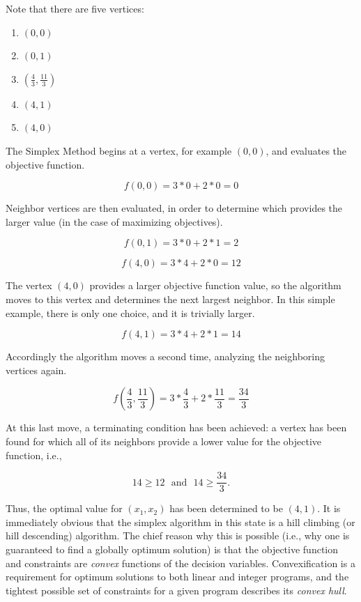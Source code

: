Note that there are five vertices:

\begin{enumerate}
  \item $(0, 0)$
  \item $(0, 1)$
  \item $(\frac{4}{3}, \frac{11}{3})$
  \item $(4, 1)$
  \item $(4, 0)$
\end{enumerate}

The Simplex Method begins at a vertex, for example $(0, 0)$, and evaluates the
objective function.

\begin{equation}
    f(0, 0) = 3 * 0 + 2 * 0 = 0 
\end{equation}

Neighbor vertices are then evaluated, in order to determine which provides the
larger value (in the case of maximizing objectives).

\begin{equation}
    f(0, 1) = 3 * 0 + 2 * 1 = 2 
\end{equation}

\begin{equation}
    f(4, 0) = 3 * 4 + 2 * 0 = 12 
\end{equation}

The vertex $(4, 0)$ provides a larger objective function value, so the algorithm
moves to this vertex and determines the next largest neighbor. In this simple
example, there is only one choice, and it is trivially larger.

\begin{equation}
    f(4, 1) = 3 * 4 + 2 * 1 = 14 
\end{equation}

Accordingly the algorithm moves a second time, analyzing the neighboring
vertices again.

\begin{equation}
    f(\frac{4}{3}, \frac{11}{3}) = 3 * \frac{4}{3} + 2 * \frac{11}{3} = \frac{34}{3} 
\end{equation}

At this last move, a terminating condition has been achieved: a vertex has been
found for which all of its neighbors provide a lower value for the objective
function, i.e.,

\begin{equation}
    14 \geq 12 \:\:\: \text{and} \:\:\: 14 \geq \frac{34}{3}.
\end{equation}

Thus, the optimal value for $(x_1, x_2)$ has been determined to be $(4, 1)$. It
is immediately obvious that the simplex algorithm in this state is a hill
climbing (or hill descending) algorithm. The chief reason why this is possible
(i.e., why one is guaranteed to find a globally optimum solution) is that the
objective function and constraints are \textit{convex} functions of the decision
variables. Convexification is a requirement for optimum solutions to both linear
and integer programs, and the tightest possible set of constraints for a given
program describes its \textit{convex hull}.
